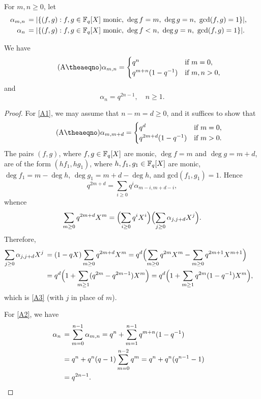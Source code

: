 \documentclass{amsart}
\numberwithin{equation}{section}
\theoremstyle{definition}
\newcommand{\f}{\Bbb F}
\begin{document}
For $m,n\ge 0$, let
\begin{align*}
\alpha_{m,n}\,&=|\{(f,g):f,g\in\f_q[X]\ \text{monic},\ \deg f=m,\ \deg g=n,\ \text{gcd}(f,g)=1\}|,\cr
\alpha_{n}\,&=|\{(f,g):f,g\in\f_q[X]\ \text{monic},\ \deg f<n,\ \deg g=n,\ \text{gcd}(f,g)=1\}|.
\end{align*}

\begin{Alem}\label{LA1}
We have
\begin{equation}\tag{A\theaeqno}\label{A1}
\alpha_{m,n}=\begin{cases}
q^n&\text{if}\ m=0,\cr
q^{m+n}(1-q^{-1})&\text{if}\ m,n>0,
\end{cases}
\end{equation}
and
\begin{equation}\tag{A\theaeqno}\label{A2}
\alpha_{n}=q^{2n-1},\quad n\ge 1.
\end{equation}
\end{Alem}

\begin{proof}
For \eqref{A1}, we may assume that $n-m=d\ge 0$, and it suffices to show that
\begin{equation}\tag{A\theaeqno}\label{A3}
\alpha_{m,m+d}=\begin{cases}
q^d&\text{if}\ m=0,\cr
q^{2m+d}(1-q^{-1})&\text{if}\ m>0.
\end{cases}
\end{equation}
The pairs $(f,g)$, where $f,g\in\f_q[X]$ are monic, $\deg f=m$ and $\deg g=m+d$,  are of the form $(hf_1,hg_1)$, where $h,f_1,g_1\in\f_q[X]$ are monic, $\deg f_1=m-\deg h$, $\deg g_1=m+d-\deg h$, and $\text{gcd}(f_1,g_1)=1$. Hence
\[
q^{2m+d}=\sum_{i\ge 0}q^i\alpha_{m-i,m+d-i},
\]
whence
\[
\sum_{m\ge 0}q^{2m+d}X^m=\Bigl(\sum_{i\ge 0}q^iX^i\Bigr)\Bigl(\sum_{j\ge 0}\alpha_{j,j+d}X^j\Bigr).
\]
Therefore,
\begin{align*}
\sum_{j\ge 0}\alpha_{j,j+d}X^j\,&=(1-qX)\sum_{m\ge 0}q^{2m+d}X^m=q^d\Bigl(\sum_{m\ge 0}q^{2m}X^m-\sum_{m\ge 0}q^{2m+1}X^{m+1}\Bigr)\cr
&=q^d\Bigl(1+\sum_{m\ge 1}(q^{2m}-q^{2m-1})X^m\Bigr)=q^d\Bigl(1+\sum_{m\ge 1}q^{2m}(1-q^{-1})X^m\Bigr),
\end{align*}
which is \eqref{A3} (with $j$ in place of $m$).

For \eqref{A2}, we have
\begin{align*}
\alpha_n\,&=\sum_{m=0}^{n-1}\alpha_{m,n}=q^n+\sum_{m=1}^{n-1}q^{m+n}(1-q^{-1})\cr
&=q^n+q^n(q-1)\sum_{m=0}^{n-2}q^m=q^n+q^n(q^{n-1}-1)\cr
&=q^{2n-1}.
\end{align*}
\end{proof}
\end{document}
